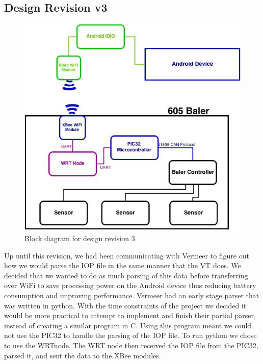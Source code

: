 \documentclass[paper=a4, fontsize=11pt]{scrartcl}
\numberwithin{equation}{section}		%
\numberwithin{figure}{section}			%
\numberwithin{table}{section}				%
\begin{document}
\subsection{Design Revision v3} 
 \begin{figure}[H]
	 \center\includegraphics[scale=0.4]{rev3.jpg}
 \caption{Block diagram for design revision 3}
 \end{figure}
Up until this revision, we had been communicating with Vermeer to figure out how we would parse the IOP file in the same manner that the VT does. We decided that we wanted to do as much parsing of this data before transferring over WiFi to save processing power on the Android device thus reducing battery consumption and improving performance. Vermeer had an early stage parser that was written in python. With the time constraints of the project we decided it would be more practical to attempt to implement and finish their partial parser, instead of creating a similar program in C. Using this program meant we could not use the PIC32 to handle the parsing of the IOP file. To run python we chose to use the WRTnode. The WRT node then received the IOP file from the PIC32, parsed it, and sent the data to the XBee modules. \\
\end{document}
